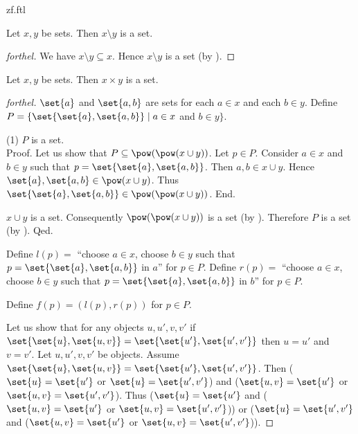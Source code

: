 \documentclass{naproche-library}
\begin{document}
\begin{smodule}{zf.ftl}
  \begin{proposition}[forthel,id=FOUNDATIONS_10_7795203882614784,printid]
    Let $x, y$ be sets.
    Then $x \setminus y$ is a set.
  \end{proposition}
  \begin{proof}[forthel]
    We have $x \setminus y \subseteq x$.
    Hence $x \setminus y$ is a set (by ).
  \end{proof}

  \begin{proposition}[forthel,id=FOUNDATIONS_10_4458706448154624,printid]
    Let $x, y$ be sets.
    Then $x \times y$ is a set.
  \end{proposition}
  \begin{proof}[forthel]
    $\set{a}$ and $\set{a,b}$ are sets for each $a \in x$ and each $b \in y$.
    Define $P = \{ \set{\set{a}, \set{a,b}} \mid a \in x$ and $b \in y \}$.

    (1) $P$ is a set. \\
    Proof.
      Let us show that $P \subseteq \pow(\pow(x \cup y))$.
        Let $p \in P$.
        Consider $a \in x$ and $b \in y$ such that $p = \set{\set{a},\set{a,b}}$.
        Then $a, b \in x \cup y$.
        Hence $\set{a}, \set{a,b} \in \pow(x \cup y)$.
        Thus $\set{\set{a}, \set{a,b}} \in \pow(\pow(x \cup y))$.
      End.

      $x \cup y$ is a set.
      Consequently $\pow(\pow(x \cup y))$ is a set (by ).
      Therefore $P$ is a set (by ).
    Qed.

    Define $l(p) =$ ``choose $a \in x$, choose $b \in y$ such that $p = \set{\set{a}, \set{a,b}}$ in $a$'' for $p \in P$.
    Define $r(p) =$ ``choose $a \in x$, choose $b \in y$ such that $p = \set{\set{a}, \set{a,b}}$ in $b$'' for $p \in P$.

    Define $f(p) = (l(p), r(p))$ for $p \in P$.

    Let us show that for any objects $u, u', v, v'$ if
    $\set{\set{u}, \set{u,v}} = \set{\set{u'}, \set{u',v'}}$ then $u = u'$ and $v = v'$.
      Let $u, u', v, v'$ be objects.
      Assume $\set{\set{u}, \set{u,v}} = \set{\set{u'}, \set{u',v'}}$.
      Then ($\set{u} = \set{u'}$ or $\set{u} = \set{u',v'}$) and ($\set{u,v} = \set{u'}$ or $\set{u,v} = \set{u',v'}$).
      Thus ($\set{u} = \set{u'}$ and ($\set{u,v} = \set{u'}$ or $\set{u,v} = \set{u',v'}$)) or ($\set{u} = \set{u',v'}$ and ($\set{u,v} = \set{u'}$ or $\set{u,v} = \set{u',v'}$)).


\end{proof}
\end{smodule}
\end{document}
